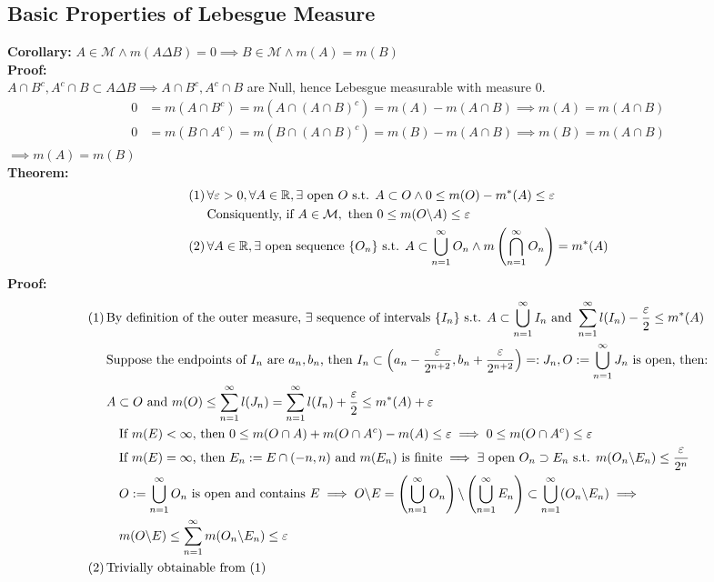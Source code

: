 \documentclass{article}
\newcommand{\R}{\mathbb{R}}
\newcommand{\sumninf}{\displaystyle\sum_{n=1}^\infty}
\newcommand{\infcap}{\displaystyle\bigcap_{n=1}^\infty}
\newcommand{\infcup}{\displaystyle\bigcup_{n=1}^\infty}
\newcommand{\st}{\mbox{ s.t. }}
\newcommand{\0}{{\bf{0}}}
\newcommand{\1}{{\bf{1}}}
\begin{document}
\subsection{Basic Properties of Lebesgue Measure}
\textbf{Corollary:} $A\in\mathcal{M}\land m(A\Delta B)=0\implies B\in\mathcal{M}\land m(A)=m(B)$\\
\textbf{Proof:}\\
$A\cap B^c,A^c\cap B\subset A\Delta B\implies A\cap B^c,A^c\cap B$ are Null, hence Lebesgue measurable with measure 0.
\begin{equation}
\begin{split}
    0&=m(A\cap B^c)=m(A\cap (A\cap B)^c)=m(A)-m(A\cap B)\implies m(A)=m(A\cap B)\\
    0&=m(B\cap A^c)=m(B\cap (A\cap B)^c)=m(B)-m(A\cap B)\implies m(B)=m(A\cap B)
\end{split}
\end{equation}
$\implies m(A)=m(B)$\\
\textbf{Theorem:}
\begin{equation}
\begin{split}
    (1)\,&\forall\varepsilon>0,\forall A\in\R,\exists\mbox{ open }O\st A\subset O\land0\le m(O)-m^*(A)\le\varepsilon\\
    &\mbox{Consiquently, if }A\in\mathcal{M},\mbox{ then }0\le m(O\symbol{92}A)\le\varepsilon\\
    (2)\,&\forall A\in\R,\exists\mbox{ open sequence }\{O_n\}\st A\subset\infcup O_n\land m\left(\infcap O_n\right)=m^*(A)
\end{split}
\end{equation}
\textbf{Proof:}
\begin{equation}
\begin{split}
    (1)\,&\mbox{By definition of the outer measure, }\exists\mbox{ sequence of intervals }\{I_n\}\st A\subset\infcup I_n\mbox{ and }\sumninf l(I_n)-\frac{\varepsilon}{2}\le m^*(A)\\
    &\mbox{Suppose the endpoints of }I_n\mbox{ are }a_n,b_n\mbox{, then }I_n\subset\left(a_n-\frac{\varepsilon}{2^{n+2}},b_n+\frac{\varepsilon}{2^{n+2}}\right)=:J_n, O:=\infcup J_n\mbox{ is open, then:}\\
    &A\subset O\mbox{ and }m(O)\le\sumninf l(J_n)=\sumninf l(I_n)+\frac{\varepsilon}{2}\le m^*(A)+\varepsilon\\
    &\quad\mbox{If }m(E)<\infty\mbox{, then }0\le m(O\cap A)+m(O\cap A^c)-m(A)\le\varepsilon\implies0\le m(O\cap A^c)\le\varepsilon\\
    &\quad\mbox{If }m(E)=\infty\mbox{, then }E_n:=E\cap(-n,n)\mbox{ and }m(E_n)\mbox{ is finite}\implies\exists\mbox{ open }O_n\supset E_n\st m(O_n\symbol{92}E_n)\le\frac{\varepsilon}{2^n}\\
    &\quad O:=\infcup O_n\mbox{ is open and contains }E\implies O\symbol{92}E=\left(\infcup O_n\right){\symbol{92}}\left(\infcup E_n\right)\subset\infcup(O_n\symbol{92}E_n)\implies\\
    &\quad m(O\symbol{92}E)\le\sumninf m(O_n\symbol{92}E_n)\le\varepsilon\\
    (2)\,&\mbox{Trivially obtainable from (1)}
\end{split}
\end{equation}
\end{document}
